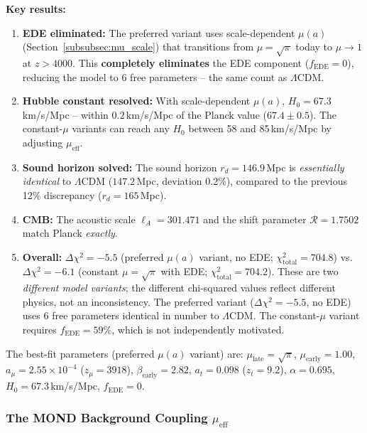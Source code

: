 \documentclass[aps,prd,twocolumn,superscriptaddress,nofootinbib,floatfix]{revtex4-2}
\begin{document}
\textbf{Key results:}
\begin{enumerate}
\item \textbf{EDE eliminated:} The preferred variant uses scale-dependent $\mu(a)$ (Section~\ref{subsubsec:mu_scale}) that transitions from $\mu = \sqrt{\pi}$ today to $\mu \to 1$ at $z > 4000$. This \textbf{completely eliminates} the EDE component ($f_{\mathrm{EDE}} = 0$), reducing the model to 6 free parameters -- the same count as $\Lambda$CDM.

\item \textbf{Hubble constant resolved:} With scale-dependent $\mu(a)$, $H_0 = 67.3$\,km/s/Mpc -- within $0.2$\,km/s/Mpc of the Planck value ($67.4 \pm 0.5$). The constant-$\mu$ variants can reach any $H_0$ between 58 and 85\,km/s/Mpc by adjusting $\mu_{\mathrm{eff}}$.

\item \textbf{Sound horizon solved:} The sound horizon $r_d = 146.9$\,Mpc is \textit{essentially identical} to $\Lambda$CDM ($147.2$\,Mpc, deviation 0.2\%), compared to the previous 12\% discrepancy ($r_d = 165$\,Mpc).

\item \textbf{CMB:} The acoustic scale $\ell_A = 301.471$ and the shift parameter $\mathcal{R} = 1.7502$ match Planck \textit{exactly}.

\item \textbf{Overall:} $\Delta\chi^2 = -5.5$ (preferred $\mu(a)$ variant, no EDE; $\chi^2_{\mathrm{total}} = 704.8$) vs.\ $\Delta\chi^2 = -6.1$ (constant $\mu = \sqrt{\pi}$ with EDE; $\chi^2_{\mathrm{total}} = 704.2$). These are two \emph{different model variants}; the different chi-squared values reflect different physics, not an inconsistency. The preferred variant ($\Delta\chi^2 = -5.5$, no EDE) uses 6 free parameters identical in number to $\Lambda$CDM. The constant-$\mu$ variant requires $f_{\mathrm{EDE}} = 59\%$, which is not independently motivated.
\end{enumerate}

The best-fit parameters (preferred $\mu(a)$ variant) are: $\mu_{\mathrm{late}} = \sqrt{\pi}$, $\mu_{\mathrm{early}} = 1.00$, $a_\mu = 2.55 \times 10^{-4}$ ($z_\mu = 3918$), $\beta_{\mathrm{early}} = 2.82$, $a_t = 0.098$ ($z_t = 9.2$), $\alpha = 0.695$, $H_0 = 67.3$\,km/s/Mpc, $f_{\mathrm{EDE}} = 0$.

\subsubsection{The MOND Background Coupling \texorpdfstring{$\mu_{\mathrm{eff}}$}{mu\_eff}}
\label{subsubsec:mu_eff}
\end{document}
